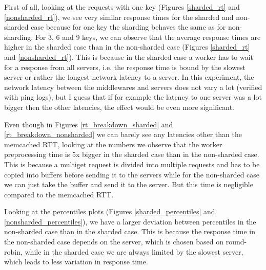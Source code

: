 First of all, looking at the requests with one key (Figures \ref{sharded_rt} and \ref{nonsharded_rt}), we see very similar response times for the sharded and non-sharded case because for one key the sharding behaves the same as for non-sharding.  For 3, 6 and 9 keys, we can observe that the average response times are higher in the sharded case than in the non-sharded case (Figures \ref{sharded_rt} and \ref{nonsharded_rt}). This is because in the sharded case a worker has to wait for a response from all servers, i.e. the response time is bound by the slowest server or rather the longest network latency to a server. In this experiment, the network latency between the middlewares and servers does not vary a lot (verified with ping logs), but I guess that if for example the latency to one server was a lot bigger then the other latencies, the effect would be even more significant. 

Even though in Figures \ref{rt_breakdown_sharded} and \ref{rt_breakdown_nonsharded} we can barely see any latencies other than the memcached RTT, looking at the numbers we observe that the worker preprocessing time is 5x bigger in the sharded case than in the non-sharded case. This is because a multiget request is divided into multiple requests and has to be copied into buffers before sending it to the servers while for the non-sharded case we can just take the buffer and send it to the server. But this time is negligible compared to the memcached RTT. 

Looking at the percentiles plots (Figures \ref{sharded_percentiles} and \ref{nonsharded_percentiles}), we have a larger deviation between percentiles in the non-sharded case than in the sharded case. This is because the response time in the non-sharded case depends on the server, which is chosen based on round-robin, while in the sharded case we are always limited by the slowest server, which leads to less variation in response time.

